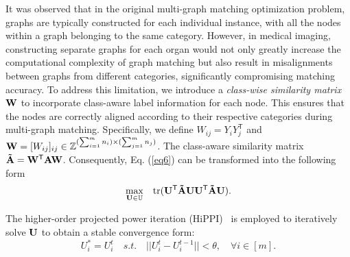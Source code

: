 It was observed that in the original multi-graph matching optimization problem, graphs are typically constructed for each individual instance, with all the nodes within a graph belonging to the same category. However, in medical imaging, constructing separate graphs for each organ would not only greatly increase the computational complexity of graph matching but also result in misalignments between graphs from different categories, significantly compromising matching accuracy. To address this limitation, we introduce a \textit{class-wise similarity matrix} $\bold{W}$ to incorporate class-aware label information for each node. This ensures that the nodes are correctly aligned according to their respective categories during multi-graph matching.
Specifically, we define $W_{ij} = {Y}_i {Y}_j^{\mathsf{T}} $ and $\bold{W} = [W_{ij}]_{ij} \in \mathbb{Z}^{(\sum_{i=1}^{m}n_i)\times(\sum_{j=1}^{m}n_j)}$. The class-aware similarity matrix $\bold{\tilde{A}} = \bold{W}^{\mathsf{T}} \bold{A}\bold{W}$. Consequently, Eq. (\ref{eq6}) can be transformed into the following form
\vspace{-5pt}
\begin{equation}
    \underset{\bold{U} \in \mathbb{U}}{\max} \quad \text{tr}(\bold{U}^{\mathsf{T}} \bold{\tilde{A}} \bold{U} \bold{U}^{\mathsf{T}} \bold{\tilde{A}} \bold{U}).
\end{equation}


The higher-order projected power iteration (HiPPI)~\cite{bernard2019hippi} is employed to iteratively solve $\bold{U}$ to obtain a stable convergence form:
\vspace{-5pt}
\begin{equation}
    U_i^\ast = U^t_i \quad s.t. \quad || U^t_i - U^{t-1}_i|| < \theta, \quad \forall i \in [m].
\end{equation}

